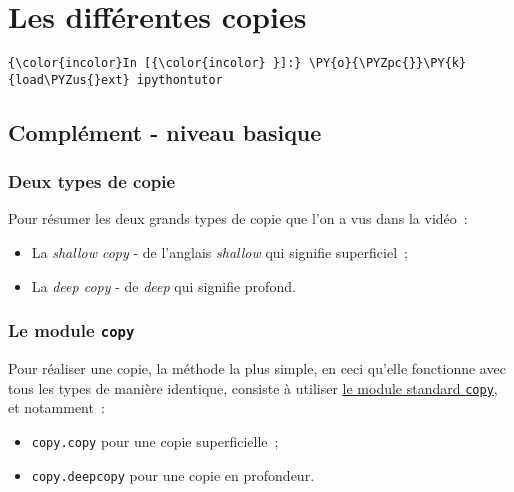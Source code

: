     \hypertarget{les-diffuxe9rentes-copies}{%
\section{Les différentes copies}\label{les-diffuxe9rentes-copies}}

    \begin{Verbatim}[commandchars=\\\{\}]
{\color{incolor}In [{\color{incolor} }]:} \PY{o}{\PYZpc{}}\PY{k}{load\PYZus{}ext} ipythontutor
\end{Verbatim}


    \hypertarget{compluxe9ment---niveau-basique}{%
\subsection{Complément - niveau
basique}\label{compluxe9ment---niveau-basique}}

    \hypertarget{deux-types-de-copie}{%
\subsubsection{Deux types de copie}\label{deux-types-de-copie}}

    Pour résumer les deux grands types de copie que l'on a vus dans la
vidéo~:

\begin{itemize}
	\item 
	La \emph{shallow copy} - de l'anglais \emph{shallow} qui
	signifie superficiel~;
	\item
	La \emph{deep copy} - de \emph{deep} qui
	signifie profond.
\end{itemize}

    \hypertarget{le-module-copy}{%
\subsubsection{\texorpdfstring{Le module
\texttt{copy}}{Le module copy}}\label{le-module-copy}}

    Pour réaliser une copie, la méthode la plus simple, en ceci qu'elle
fonctionne avec tous les types de manière identique, consiste à utiliser
\href{https://docs.python.org/3/library/copy.html}{le module standard
\texttt{copy}}, et notamment~:

\begin{itemize}
	\item 
	\texttt{copy.copy} pour une copie superficielle~;
	\item
	\texttt{copy.deepcopy} pour une copie en profondeur.
\end{itemize}

